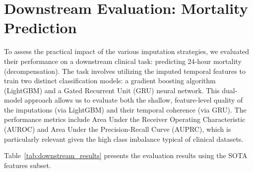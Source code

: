 \section{Downstream Evaluation: Mortality Prediction}
\label{sec:downstream_evaluation}

To assess the practical impact of the various imputation strategies, we evaluated their performance on a downstream clinical task: predicting 24-hour mortality (decompensation). The task involves utilizing the imputed temporal features to train two distinct classification models: a gradient boosting algorithm (LightGBM) and a Gated Recurrent Unit (GRU) neural network. This dual-model approach allows us to evaluate both the shallow, feature-level quality of the imputations (via LightGBM) and their temporal coherence (via GRU). The performance metrics include Area Under the Receiver Operating Characteristic (AUROC) and Area Under the Precision-Recall Curve (AUPRC), which is particularly relevant given the high class imbalance typical of clinical datasets.

Table~\ref{tab:downstream_results} presents the evaluation results using the SOTA features subset.

\begin{table}[htbp]
\centering
\caption{Downstream performance (Mortality Prediction) of different imputation methods.}
\label{tab:downstream_results}
\end{table}

